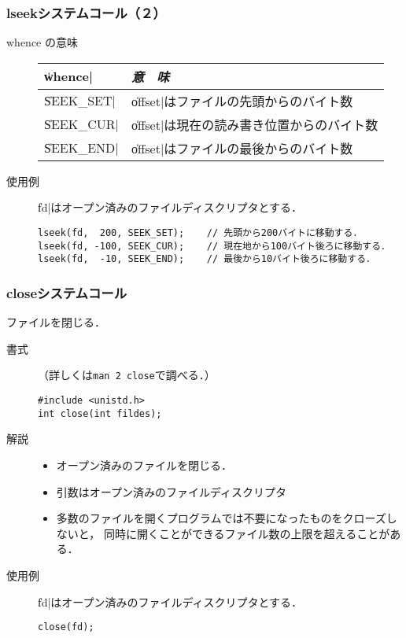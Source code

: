 \documentclass{beamer}                 %
\begin{document}
\begin{frame}[fragile]
  \frametitle{lseekシステムコール（２）}
\begin{description}
\item[whence の意味]
\begin{tabular}{l | l}
\hline\hline
\|whence|    & \emph{意　味} \\\hline
\|SEEK_SET|  &  \|offset|はファイルの先頭からのバイト数  \\
\|SEEK_CUR|  &  \|offset|は現在の読み書き位置からのバイト数  \\
\|SEEK_END|  &  \|offset|はファイルの最後からのバイト数  \\
\end{tabular}

\vfill

\item[使用例]
\|fd|はオープン済みのファイルディスクリプタとする．

\begin{lstlisting}[numbers=none]
lseek(fd,  200, SEEK_SET);    // 先頭から200バイトに移動する．
lseek(fd, -100, SEEK_CUR);    // 現在地から100バイト後ろに移動する．
lseek(fd,  -10, SEEK_END);    // 最後から10バイト後ろに移動する．
\end{lstlisting}

\end{description}
\end{frame}

\begin{frame}[fragile]
  \frametitle{closeシステムコール}
ファイルを閉じる．
\begin{description}
\item[書式]（詳しくは\texttt{man 2 close}で調べる．）

\begin{lstlisting}[numbers=none]
#include <unistd.h>
int close(int fildes);
\end{lstlisting}

\item[解説]
\begin{itemize}
\item オープン済みのファイルを閉じる．
\item 引数はオープン済みのファイルディスクリプタ
\item 多数のファイルを開くプログラムでは不要になったものをクローズしないと，
同時に開くことができるファイル数の上限を超えることがある．
\end{itemize}

\item[使用例]
\|fd|はオープン済みのファイルディスクリプタとする．

\begin{lstlisting}[numbers=none]
close(fd);
\end{lstlisting}
\end{description}
\end{frame}
\end{document}

